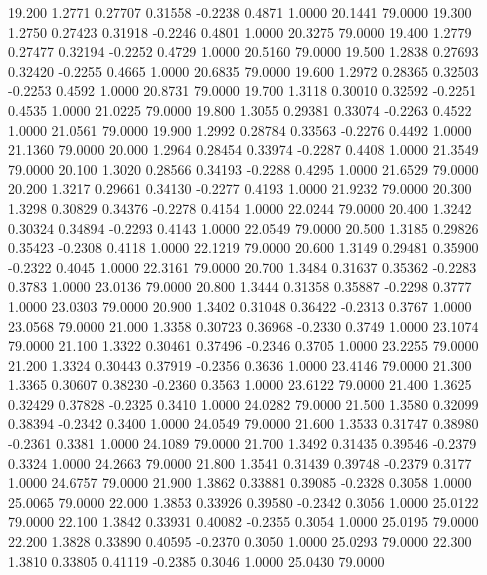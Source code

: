   19.200   1.2771   0.27707   0.31558  -0.2238   0.4871   1.0000  20.1441  79.0000
  19.300   1.2750   0.27423   0.31918  -0.2246   0.4801   1.0000  20.3275  79.0000
  19.400   1.2779   0.27477   0.32194  -0.2252   0.4729   1.0000  20.5160  79.0000
  19.500   1.2838   0.27693   0.32420  -0.2255   0.4665   1.0000  20.6835  79.0000
  19.600   1.2972   0.28365   0.32503  -0.2253   0.4592   1.0000  20.8731  79.0000
  19.700   1.3118   0.30010   0.32592  -0.2251   0.4535   1.0000  21.0225  79.0000
  19.800   1.3055   0.29381   0.33074  -0.2263   0.4522   1.0000  21.0561  79.0000
  19.900   1.2992   0.28784   0.33563  -0.2276   0.4492   1.0000  21.1360  79.0000
  20.000   1.2964   0.28454   0.33974  -0.2287   0.4408   1.0000  21.3549  79.0000
  20.100   1.3020   0.28566   0.34193  -0.2288   0.4295   1.0000  21.6529  79.0000
  20.200   1.3217   0.29661   0.34130  -0.2277   0.4193   1.0000  21.9232  79.0000
  20.300   1.3298   0.30829   0.34376  -0.2278   0.4154   1.0000  22.0244  79.0000
  20.400   1.3242   0.30324   0.34894  -0.2293   0.4143   1.0000  22.0549  79.0000
  20.500   1.3185   0.29826   0.35423  -0.2308   0.4118   1.0000  22.1219  79.0000
  20.600   1.3149   0.29481   0.35900  -0.2322   0.4045   1.0000  22.3161  79.0000
  20.700   1.3484   0.31637   0.35362  -0.2283   0.3783   1.0000  23.0136  79.0000
  20.800   1.3444   0.31358   0.35887  -0.2298   0.3777   1.0000  23.0303  79.0000
  20.900   1.3402   0.31048   0.36422  -0.2313   0.3767   1.0000  23.0568  79.0000
  21.000   1.3358   0.30723   0.36968  -0.2330   0.3749   1.0000  23.1074  79.0000
  21.100   1.3322   0.30461   0.37496  -0.2346   0.3705   1.0000  23.2255  79.0000
  21.200   1.3324   0.30443   0.37919  -0.2356   0.3636   1.0000  23.4146  79.0000
  21.300   1.3365   0.30607   0.38230  -0.2360   0.3563   1.0000  23.6122  79.0000
  21.400   1.3625   0.32429   0.37828  -0.2325   0.3410   1.0000  24.0282  79.0000
  21.500   1.3580   0.32099   0.38394  -0.2342   0.3400   1.0000  24.0549  79.0000
  21.600   1.3533   0.31747   0.38980  -0.2361   0.3381   1.0000  24.1089  79.0000
  21.700   1.3492   0.31435   0.39546  -0.2379   0.3324   1.0000  24.2663  79.0000
  21.800   1.3541   0.31439   0.39748  -0.2379   0.3177   1.0000  24.6757  79.0000
  21.900   1.3862   0.33881   0.39085  -0.2328   0.3058   1.0000  25.0065  79.0000
  22.000   1.3853   0.33926   0.39580  -0.2342   0.3056   1.0000  25.0122  79.0000
  22.100   1.3842   0.33931   0.40082  -0.2355   0.3054   1.0000  25.0195  79.0000
  22.200   1.3828   0.33890   0.40595  -0.2370   0.3050   1.0000  25.0293  79.0000
  22.300   1.3810   0.33805   0.41119  -0.2385   0.3046   1.0000  25.0430  79.0000
